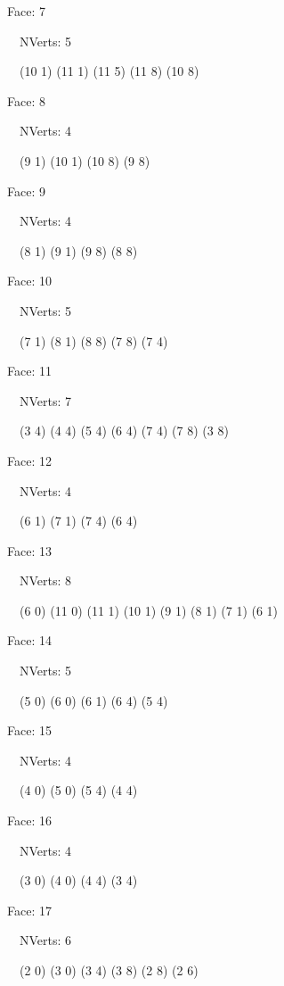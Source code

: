 \documentclass{article}
\begin{document}
{\footnotesize 

Face: 7

\   \    NVerts: 5

 \   \   (10 1) (11 1) (11 5) (11 8) (10 8)}

{\footnotesize 

Face: 8

\   \    NVerts: 4

 \   \   (9 1) (10 1) (10 8) (9 8)}

{\footnotesize 

Face: 9

\   \    NVerts: 4

 \   \   (8 1) (9 1) (9 8) (8 8)}

{\footnotesize 

Face: 10

\   \    NVerts: 5

 \   \   (7 1) (8 1) (8 8) (7 8) (7 4)}

{\footnotesize 

Face: 11

\   \    NVerts: 7

 \   \   (3 4) (4 4) (5 4) (6 4) (7 4) (7 8) (3 8)}

{\footnotesize 

Face: 12

\   \    NVerts: 4

 \   \   (6 1) (7 1) (7 4) (6 4)}

{\footnotesize 

Face: 13

\   \    NVerts: 8

 \   \   (6 0) (11 0) (11 1) (10 1) (9 1) (8 1) (7 1) (6 1)}

{\footnotesize 

Face: 14

\   \    NVerts: 5

 \   \   (5 0) (6 0) (6 1) (6 4) (5 4)}

{\footnotesize 

Face: 15

\   \    NVerts: 4

 \   \   (4 0) (5 0) (5 4) (4 4)}

{\footnotesize 

Face: 16

\   \    NVerts: 4

 \   \   (3 0) (4 0) (4 4) (3 4)}

{\footnotesize 

Face: 17

\   \    NVerts: 6

 \   \   (2 0) (3 0) (3 4) (3 8) (2 8) (2 6)}
\end{document}
